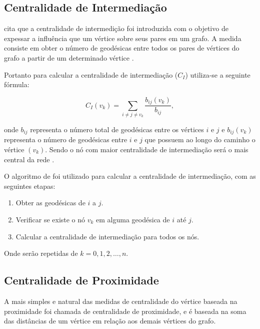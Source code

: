 \documentclass[12pt]{article}
\begin{document}
\subsection{Centralidade de Intermediação}
\cite{freitas} cita que a centralidade de intermedição foi introduzida com o objetivo de expessar a influência que um vértice sobre seus pares em um grafo.
A medida consiste em obter o número de geodésicas entre todos os pares de vértices do grafo a partir de um determinado vértice \cite{freitas}.

Portanto para calcular a centralidade de intermediação ($C_I$) utiliza-se a seguinte fórmula: 
\begin{center}
\begin{equation}
C_I(v_k)=\sum_{i\neq j \neq v_{k}} \frac{b_{ij}(v_k)}{b_{ij}},
\end{equation}
\end{center}
onde $b_{ij}$ representa o número total de geodésicas entre os vértices $i$ e $j$ e  $b_{ij}(v_k)$ representa o número de geodésicas entre $i$ e $j$ que possuem ao longo do caminho o vértice $(v_k)$.
Sendo o nó com maior centralidade de intermediação será o mais central da rede \cite{ufimtsev} \cite{freeman}.

O algoritmo de \cite{Brandes01afaster} foi utilizado para calcular a centralidade de intermediação, com as seguintes etapas:
\begin{enumerate}
\item Obter as geodésicas de $i$ a $j$.
\item Verificar se existe o nó $v_k$ em alguma geodésica de $i$ até $j$.
\item Calcular a centralidade de intermediação para todos os nós.
\end{enumerate}
Onde serão repetidas de $k = 0,1,2,\dots,n$.

\subsection{Centralidade de Proximidade}
A mais simples e natural das medidas de centralidade do vértice baseada na proximidade foi chamada de centralidade de proximidade, e é baseada na soma das distâncias de um  vértice em relação aos demais vértices do grafo\cite{freitas}.
\end{document}
